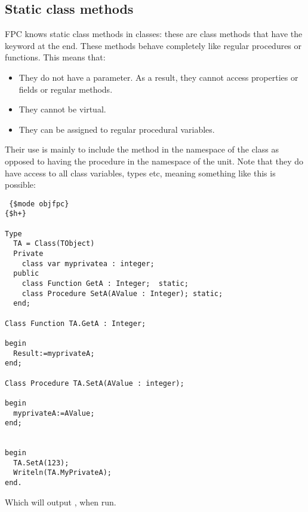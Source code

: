 \subsection{Static class methods}
FPC knows static class methods in classes: these are class methods that have the
 keyword at the end. These methods behave completely like regular
procedures or functions. This means that:
\begin{itemize}
\item They do not have a  parameter. As a result, they cannot access properties or fields or regular methods.
\item They cannot be virtual.
\item They can be assigned to regular procedural variables.
\end{itemize}
Their use is mainly to include the method in the namespace of the class as
opposed to having the procedure in the namespace of the unit.
Note that they do have access to all class variables, types etc, meaning something like this is possible:
\begin{verbatim}
 {$mode objfpc}
{$h+}

Type
  TA = Class(TObject)
  Private
    class var myprivatea : integer;
  public
    class Function GetA : Integer;  static;
    class Procedure SetA(AValue : Integer); static;
  end;

Class Function TA.GetA : Integer;

begin
  Result:=myprivateA;
end;

Class Procedure TA.SetA(AValue : integer);

begin
  myprivateA:=AValue;
end;


begin
  TA.SetA(123);
  Writeln(TA.MyPrivateA);
end.
\end{verbatim}
Which will output , when run.

